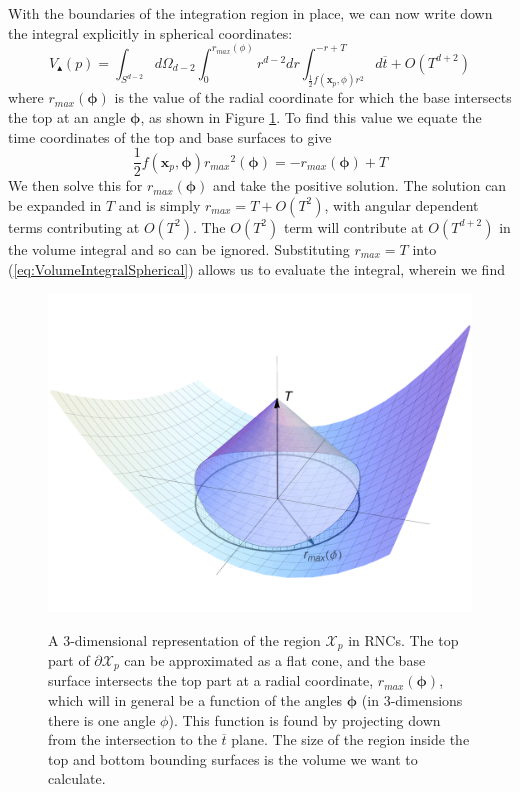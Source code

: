 \documentclass[12pt]{article}
\newcommand{\be}{\begin{equation}}
\newcommand{\ee}{\end{equation}}
\begin{document}
With the boundaries of the integration region in place, we can now write down the integral explicitly in spherical coordinates:
\be\label{eq:VolumeIntegralSpherical}
V_\blacktriangle (p)=\int_{S^{d-2}}
d\Omega_{d-2}
\int_{0}^{r_{max} (\phi)}r^{d-2}dr
\int_{\frac{1}{2}f (\mathbf{x}_p,\phi)r^2}^{-r+T}
d\overline{t}+O (T^{d+2})
\ee
where $r_{max} (\boldsymbol\phi)$ is the value of the radial coordinate for which the base intersects the top at an angle $\boldsymbol\phi$, as shown in Figure \ref{fig:cone_plot}. To find this value we equate the time coordinates of the top and base surfaces to give 
\be
\frac{1}{2}f (\mathbf{x}_p,\boldsymbol\phi){r_{max}}^2 (\boldsymbol\phi)=-r_{max} (\boldsymbol\phi)+T
\ee 
We then solve this for $r_{max} (\boldsymbol\phi)$ and take the positive solution. The solution can be expanded in $T$ and is simply $r_{max}=T+O (T^2)$, with angular dependent terms contributing at $O (T^2)$. The $O (T^2)$ term will contribute at $O (T^{d+2})$ in the volume integral and so can be ignored. Substituting $r_{max}=T$ into (\ref{eq:VolumeIntegralSpherical}) allows us to evaluate the integral, wherein we find 
\begin{figure}[t]
  \centering
    {\includegraphics[scale=0.5]{coneplot}}
     \caption{A $3$-dimensional representation of the region $\mathcal{X}_p$ in RNCs. The top part of $\partial\mathcal{X}_p$ can be approximated as a flat cone, and the base surface intersects the top part at a radial coordinate, $r_{max} (\boldsymbol\phi)$, which will in general be a function of the angles $\boldsymbol\phi$ (in $3$-dimensions there is one angle $\phi$). This function is found by projecting down from the intersection to the $\overline{t}$ plane. The size of the region inside the top and bottom bounding surfaces is the volume we want to calculate.}
     \label{fig:cone_plot}
\end{figure}
\end{document}
